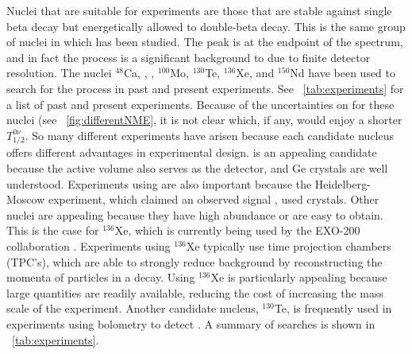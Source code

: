 Nuclei that are suitable for \zvbb experiments are those that are stable against single beta decay but energetically allowed to double-beta decay.  This is the same group of nuclei in which \tvbb has been studied.  The \zvbb peak is at the endpoint of the \tvbb spectrum, and in fact the \tvbb process is a significant background to \zvbb due to finite detector resolution.  The nuclei $^{48}$Ca, , , $^{100}$Mo, $^{130}$Te, $^{136}$Xe, and $^{150}$Nd have been used to search for the process in past and present experiments.  See {\tab}~\ref{tab:experiments} for a list of past and present experiments.  Because of the uncertainties on \NME for these nuclei (see {\fig}~\ref{fig:differentNME}, it is not clear which, if any, would enjoy a shorter $T^{0\nu}_{1/2}$.  So many different experiments have arisen because each candidate nucleus offers different advantages in experimental design.   is an appealing candidate because the active volume also serves as the detector, and Ge crystals are well understood.  Experiments using  are also important because the Heidelberg-Moscow experiment, which claimed an observed \zvbb signal \citep{KlapdorKleingrothaus}, used  crystals.  Other nuclei are appealing because they have high abundance or are easy to obtain.  This is the case for $^{136}$Xe, which is currently being used by the EXO-200 collaboration \citep{EXO200}.  Experiments using $^{136}$Xe typically use time projection chambers (TPC's), which are able to strongly reduce background by reconstructing the momenta of particles in a decay.  Using $^{136}$Xe is particularly appealing because large quantities are readily available, reducing the cost of increasing the mass scale of the experiment.  Another candidate nucleus, $^{130}$Te, is frequently used in experiments using bolometry to detect \zvbb.  A summary of \zvbb searches is shown in {\tab}~\ref{tab:experiments}.
